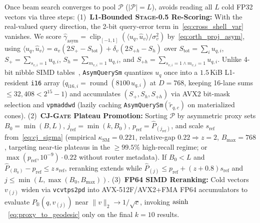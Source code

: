 Once beam search converges to pool $\mathcal{P}$ ($|\mathcal{P}| = L$), \rquiver{} avoids reading all $L$ cold FP32 vectors via three steps:
(1)~\textbf{L1-Bounded \textsc{Stage-0.5} Re-Scoring:} With the real-valued query direction, the 2-bit query-error term in~\eqref{eq:cross_shell_var} vanishes. We score $\hat{\gamma}_{\mathrm{asym}}=\operatorname{clip}_{[-1,1]}(\langle u_q,\hat{u}_v\rangle/\sigma_v^2)$ by~\eqref{eq:orth_proj_asym}, using $\langle u_q, \hat{u}_v\rangle = a_v(2 S_+ - S_{\mathrm{tot}}) + \delta_v(2 S_{+h} - S_h)$ over $S_{\mathrm{tot}} = \sum_i u_{q,i}$, $S_+ = \sum_{s_{v,i}=1} u_{q,i}$, $S_h = \sum_{m_{v,i}=1} u_{q,i}$, and $S_{+h} = \sum_{s_{v,i}=1 \land m_{v,i}=1} u_{q,i}$.
Unlike 4-bit nibble {SIMD} tables~\cite{andre2015cache,andre2017accelerated,trent2024bbq}, \texttt{AsymQuerySm} quantizes $u_q$ once into a $1.5$\,KiB L1-resident \texttt{i16} array ($q_{\mathrm{i16},i} = \operatorname{round}(8100\,u_{q,i})$ at $D=768$, keeping 16-lane sums $\le 32{,}408 < 2^{15}-1$) and accumulates $(S_+, S_h, S_{+h})$ via {AVX2} bit-mask selection and \texttt{vpmaddwd} (lazily caching \texttt{AsymQuerySm}$(\tilde{r}_{q,c})$ on materialized cones).
(2)~\textbf{\textsc{CJ-Gate} Plateau Promotion:} Sorting $\mathcal{P}$ by asymmetric proxy sets $B_0 = \min(B, L)$, $j_{\mathrm{ref}} = \min(k, B_0)$, $p_{\mathrm{ref}} = \widehat{P}_{(j_{\mathrm{ref}})}$, and scale $s_{\mathrm{ref}}$ from~\eqref{eq:cj_sigma} (empirical $\kappa_{\mathrm{SM}} = 0.221$, relative-gap $0.22 \Rightarrow z = 2$, $B_{\max} = 768$, targeting near-tie plateaus in the $\ge 99.5\%$ high-recall regime; or $\max(p_{\mathrm{ref}}, 10^{-9})\cdot 0.22$ without router metadata). If $B_0 < L$ and $\widehat{P}_{(B_0)} - p_{\mathrm{ref}} \le z\,s_{\mathrm{ref}}$, reranking extends while $\widehat{P}_{(j)} \le p_{\mathrm{ref}} + (z + 0.8)s_{\mathrm{ref}}$ and $j \le \min(L, \max(B_0, B_{\max}))$.
(3)~\textbf{FP64 {SIMD} Reranking:} Cold vectors $v_{(j)}$ widen via \texttt{vcvtps2pd} into {AVX-512F}/{AVX2+FMA} FP64 accumulators to evaluate $P_{\mathbb{B}}(q, v_{(j)})$ near $\|v\|_2 \to 1/\sqrt{c}$, invoking $\operatorname{asinh}$~\eqref{eq:proxy_to_geodesic} only on the final $k = 10$ results.
